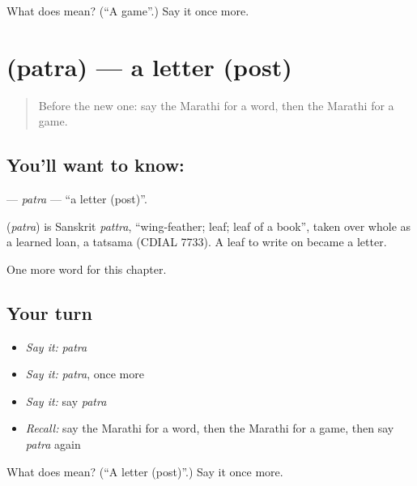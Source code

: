 \begin{tcolorbox}[breakable,colback=teal!4,colframe=teal!35!black,title={Before you move on}]
What does  mean? (\textquotedblleft{}A game\textquotedblright{}.) Say it once more.
\end{tcolorbox}
\section[\texorpdfstring{\mr{पत्र} (patra)}{पत्र (patra)}]{ (patra) — a letter (post)}

\label{lesson:MR-C95-patra}



\begin{quote}
Before the new one: say the Marathi for a word, then the Marathi for a game.
\end{quote}

\subsection*{You'll want to know: }
\textbf{} — \emph{patra} — \textquotedblleft{}a letter (post)\textquotedblright{}.

\begin{cousinweb}
\textbf{} (\emph{patra}) is Sanskrit \emph{pattra}, \textquotedblleft{}wing-feather; leaf; leaf of a book\textquotedblright{}, taken over whole as a learned loan, a tatsama (CDIAL 7733). A leaf to write on became a letter.
\end{cousinweb}

\begin{grammarlens}[title={What you've built}]
One more word for this chapter.
\end{grammarlens}

\subsection*{Your turn}
\begin{itemize}
\raggedright
  \item \emph{Say it:} \emph{patra}
  \item \emph{Say it:} \emph{patra}, once more
  \item \emph{Say it:} say \emph{patra}
  \item \emph{Recall:} say the Marathi for a word, then the Marathi for a game, then say \emph{patra} again
\end{itemize}

\begin{tcolorbox}[breakable,colback=teal!4,colframe=teal!35!black,title={Before you move on}]
What does  mean? (\textquotedblleft{}A letter (post)\textquotedblright{}.) Say it once more.
\end{tcolorbox}
